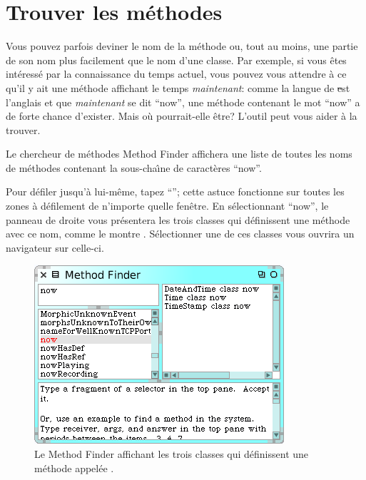 \documentclass[a4paper,10pt,twoside]{book}
\begin{document}
\section{Trouver les m\'ethodes}
\label{sec:quick:methodFinder}

Vous pouvez parfois deviner le nom de la m\'ethode ou, tout au moins,
une partie de son nom plus facilement que le nom d'une classe.
Par exemple, si vous \^etes int\'eress\'e par la connaissance du temps
actuel, vous pouvez vous attendre \`a ce qu'il y ait 
une m\'ethode affichant le temps \emph{maintenant}: comme la langue de \st
est l'anglais et que \emph{maintenant} se dit ``now'', une m\'ethode
contenant le mot ``now'' a de forte chance d'exister.
Mais o\`u pourrait-elle \^etre?
L'outil  peut vous aider \`a la trouver.

Le chercheur de m\'ethodes Method Finder affichera une liste de toutes
les noms de m\'ethodes contenant la sous-cha\^{\i}ne de caract\`eres ``now''.  

Pour d\'efiler jusqu'\`a  lui-m\^eme, tapez ``''; cette
astuce fonctionne sur toutes les zones \`a d\'efilement de n'importe
quelle fen\^etre. En s\'electionnant ``now'', le panneau de droite
vous pr\'esentera les trois classes qui d\'efinissent une m\'ethode
avec ce nom, comme le montre .
S\'electionner une de ces classes vous ouvrira un navigateur sur
celle-ci.

\begin{figure}[hbt]
\centerline {\includegraphics[scale=0.7]{methodFinder-now}}
\caption{Le Method Finder affichant les trois classes qui
  d\'efinissent une m\'ethode appel\'ee .
\label{fig:MethodFinder}}
\end{figure}
\end{document}
